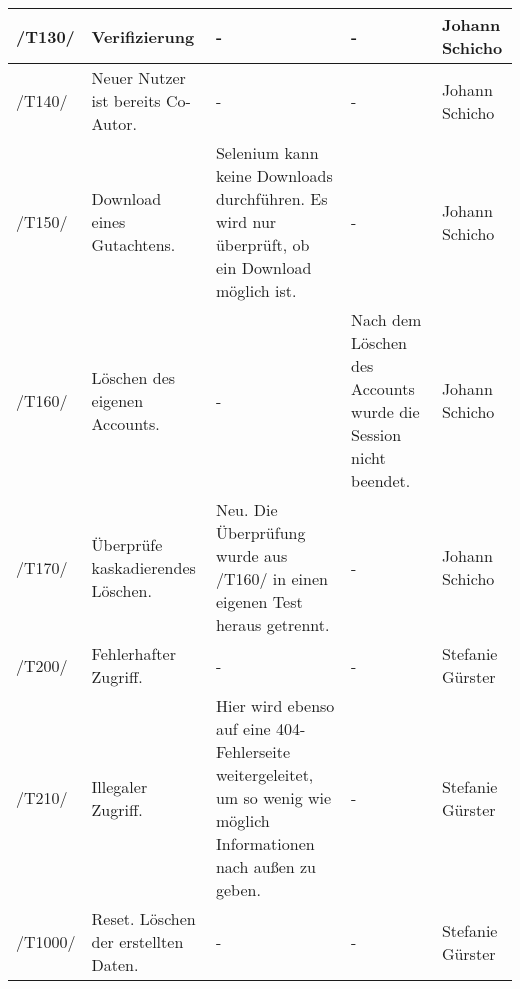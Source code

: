 \begin{longtable}{|m{1.2cm}|m{3cm}|m{3.5cm}|m{3.5cm}|l|}
		/T130/ & Verifizierung & - & - & Johann Schicho \\\hline
		/T140/ & Neuer Nutzer ist bereits Co-Autor. & - & - & Johann Schicho \\\hline
		/T150/ & Download eines Gutachtens. & Selenium kann keine Downloads durchführen. Es wird nur überprüft, ob ein Download möglich ist. & - & Johann Schicho \\\hline
		/T160/ & Löschen des eigenen Accounts. & - & Nach dem Löschen des Accounts wurde die Session nicht beendet. & Johann Schicho \\\hline
		/T170/ & Überprüfe kaskadierendes Löschen. & Neu. Die Überprüfung wurde aus /T160/ in einen eigenen Test heraus getrennt. & - & Johann Schicho \\\hline
		/T200/ & Fehlerhafter Zugriff. & - & - & Stefanie Gürster \\\hline
		/T210/ & Illegaler Zugriff. & Hier wird ebenso auf eine 404-Fehlerseite weitergeleitet, um so wenig wie möglich Informationen nach außen zu geben. & - & Stefanie Gürster \\\hline
		/T1000/ & Reset. Löschen der erstellten Daten. & - & - & Stefanie Gürster \\\hline
	\end{longtable}

